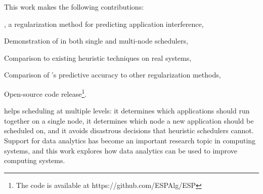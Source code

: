 This work makes the following contributions:
\begin{inparaenum}[1)]
\item \SYSTEMESP{}, a regularization method for predicting application
  interference,
\item Demonstration of \SYSTEMESP{} in both single and multi-node
  schedulers,
\item Comparison to existing heuristic techniques on real systems,
\item Comparison of \SYSTEMESP{}'s predictive accuracy to other
  regularization methods,
\item Open-source code release\footnote{The code is available at
    https://github.com/ESPAlg/ESP}.
\end{inparaenum}
\SYSTEMESP{} helps scheduling at multiple levels: it determines which
applications should run together on a single node, it determines which
node a new application should be scheduled on, and it avoids
disastrous decisions that heuristic schedulers cannot.  Support for
data analytics has become an important research topic in computing
systems, and this work explores how data analytics can be used to
improve computing systems.
